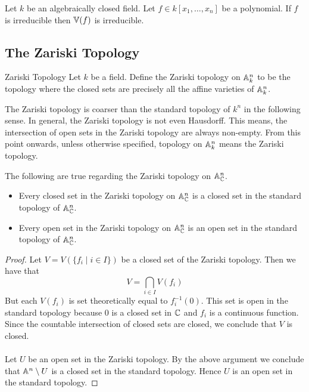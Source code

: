 \documentclass[a4paper]{article}
\begin{document}
\begin{prp}{}{} Let $k$ be an algebraically closed field. Let $f\in k[x_1,\dots,x_n]$ be a polynomial. If $f$ is irreducible then $\mathbb{V}(f)$ is irreducible. 
\end{prp}

\subsection{The Zariski Topology}
\begin{defn}{Zariski Topology}{} Let $k$ be a field. Define the Zariski topology on $\mathbb{A}_k^n$ to be the topology where the closed sets are precisely all the affine varieties of $\mathbb{A}_k^n$. 
\end{defn}

The Zariski topology is coarser than the standard topology of $k^n$ in the following sense. In general, the Zariski topology is not even Hausdorff. This means, the intersection of open sets in the Zariski topology are always non-empty. From this point onwards, unless otherwise specified, topology on $\mathbb{A}_k^n$ means the Zariski topology. 

\begin{lmm}{}{} The following are true regarding the Zariski topology on $\mathbb{A}_{\mathbb{C}}^n$. 
\begin{itemize}
\item Every closed set in the Zariski topology on $\mathbb{A}_{\mathbb{C}}^n$ is a closed set in the standard topology of $\mathbb{A}_{\mathbb{C}}^n$. 
\item Every open set in the Zariski topology on $\mathbb{A}_{\mathbb{C}}^n$ is an open set in the standard topology of $\mathbb{A}_{\mathbb{C}}^n$. 
\end{itemize} \tcbline
\begin{proof}
Let $V=V(\{f_i\;|\;i\in I\})$ be a closed set of the Zariski topology. Then we have that $$V=\bigcap_{i\in I}V(f_i)$$ But each $V(f_i)$ is set theoretically equal to $f_i^{-1}(0)$. This set is open in the standard topology because $0$ is a closed set in $\mathbb{C}$ and $f_i$ is a continuous function. Since the countable intersection of closed sets are closed, we conclude that $V$ is closed. \\~\\

Let $U$ be an open set in the Zariski topology. By the above argument we conclude that $\mathbb{A}^n\setminus U$ is a closed set in the standard topology. Hence $U$ is an open set in the standard topology. 
\end{proof}
\end{lmm}
\end{document}
